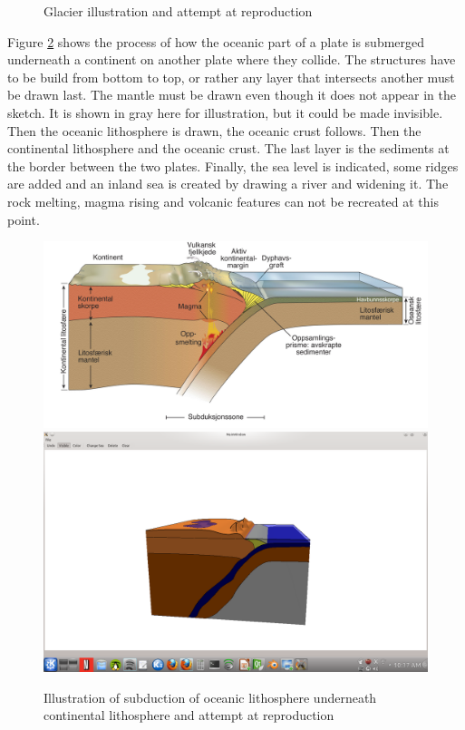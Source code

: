 \documentclass[a4paper,12pt]{report}
\begin{document}
\begin{figure}
 \caption{Glacier illustration and attempt at reproduction}
 \label{fig:glacier}
\end{figure}

Figure \ref{fig:subduction} shows the process of how the oceanic part of a plate is submerged underneath a continent on another plate where they collide. The structures have to be build from bottom to top, or rather any layer that intersects another must be drawn last. The mantle must be drawn even though it does not appear in the sketch. It is shown in gray here for illustration, but it could be made invisible. Then the oceanic lithosphere is drawn, the oceanic crust follows. Then the continental lithosphere and the oceanic crust. The last layer is the sediments at the border between the two plates. Finally, the sea level is indicated, some ridges are added and an inland sea is created by drawing a river and widening it. The rock melting, magma rising and volcanic features can not be recreated at this point.
\begin{figure}
\includegraphics[width=.8\linewidth]{thesis/resultsSection/subduction.png}
\includegraphics[trim = 50mm 30mm 50mm 50mm, clip,width=.8\linewidth]{thesis/resultsSection/subductionSketch.png}

 \caption{Illustration of subduction of oceanic lithosphere underneath continental lithosphere and attempt at reproduction}
 \label{fig:subduction}
\end{figure}
\end{document}
